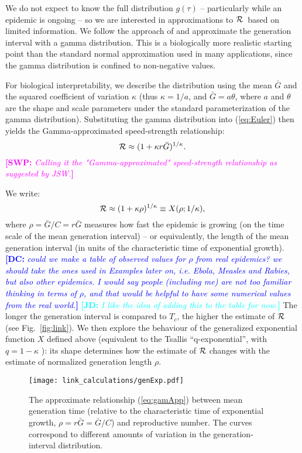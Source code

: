 \documentclass[12pt]{article}
\newcommand{\RR}{\ensuremath{{\cal R}}}
\newcommand{\Tc}{\ensuremath{C}}
\newcommand{\eref}[1]{(\ref{eq:#1})}
\newcommand{\fref}[1]{Fig.~\ref{fig:#1}}
\newcommand{\comment}[3]{\textcolor{#1}{\textbf{[#2: }\textit{#3}\textbf{]}}}
\newcommand{\jd}[1]{\comment{cyan}{JD}{#1}}
\newcommand{\swp}[1]{\comment{magenta}{SWP}{#1}}
\newcommand{\dc}[1]{\comment{blue}{DC}{#1}}
\begin{document}
We do not expect to know the full distribution $g(\tau)$ -- particularly while an epidemic is ongoing -- so we are interested in approximations to \RR\ based on limited information.
We follow the approach of \cite{NishCast09} and approximate the generation interval with a gamma distribution.
This is a biologically more realistic starting point than the standard normal approximation used in many applications, since the gamma distribution is confined to non-negative values.

For biological interpretability, we describe the distribution using the mean $\bar G$ and the squared coefficient of variation $\kappa$ (thus $\kappa = 1/a$, and $\bar G = a\theta$, where $a$ and $\theta$ are the shape and scale parameters under the standard parameterization of the gamma distribution).
Substituting the gamma distribution into \eref{Euler} then yields the Gamma-approximated speed-strength relationship:
\begin{equation}
	\RR \approx (1 + \kappa r \bar G)^{1/\kappa}.
	\label{eq:gamApp}
\end{equation}
\swp{Calling it the "Gamma-approximated" speed-strength relationship as suggested by JSW.}

We write:
\begin{equation}
	\RR \approx (1 + \kappa \rho)^{1/\kappa} \equiv X(\rho; 1/\kappa),
	\label{eq:genExp}
\end{equation}
where $\rho = \bar G/\Tc = r\bar G$ measures how fast the epidemic is growing (on the time scale of the mean generation interval) -- or equivalently, the length of the mean generation interval (in units of the characteristic time of exponential growth).
\dc{could we make a table of observed values for $\rho$ from real epidemics? we should take the ones used in Examples later on, i.e. Ebola, Measles and Rabies, but also other epidemics. I would say people (including me) are not too familiar thinking in terms of $\rho$, and that would be helpful to have some numerical values from the real world.}
\jd{I like the idea of adding this to the table for now.}
The longer the generation interval is compared to $T_c$, the higher the estimate of $\RR$ (see \fref{link}).
We then explore the behaviour of the generalized exponential function $X$ defined above (equivalent to the Tsallis ``q-exponential'', with $q=1-\kappa$ \cite{tsallis1994numbers}): its shape determines how the estimate of $\RR$ changes with the estimate of normalized generation length $\rho$.

\begin{figure}[htbp]
	\centering \texttt{[image: link\_calculations/genExp.pdf]}
	\caption{
		The approximate relationship \eref{gamApp} between mean
		generation time (relative to the characteristic time of
		exponential growth, $\rho = r \bar G = \bar G/\Tc$)
		and reproductive number.
		The curves correspond to different
		amounts of variation in the generation-interval
		distribution. 
	} \label{fig:genExp} 
\end{figure}
\end{document}
